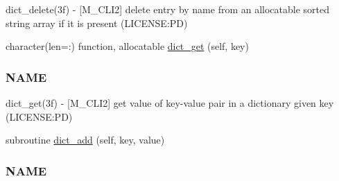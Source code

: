 \begin{DoxyCompactItemize}
\begin{DoxyCompactList}
dict\+\_\+delete(3f) -\/ \mbox{[}M\+\_\+\+C\+L\+I2\mbox{]} delete entry by name from an allocatable sorted string array if it is present (L\+I\+C\+E\+N\+SE\+:PD) \end{DoxyCompactList}\item 
character(len=\+:) function, allocatable \mbox{\hyperlink{namespacem__cli2_a5b489c992f1434fa27e7858a483a38c7}{dict\+\_\+get}} (self, key)
\begin{DoxyCompactList}\small\item\em \subsubsection*{N\+A\+ME}

dict\+\_\+get(3f) -\/ \mbox{[}M\+\_\+\+C\+L\+I2\mbox{]} get value of key-\/value pair in a dictionary given key (L\+I\+C\+E\+N\+SE\+:PD) \end{DoxyCompactList}\item 
subroutine \mbox{\hyperlink{namespacem__cli2_a601a06b7038b524abababc8d437ee823}{dict\+\_\+add}} (self, key, value)
\begin{DoxyCompactList}\small\item\em \subsubsection*{N\+A\+ME}


\end{DoxyCompactList}
\end{DoxyCompactItemize}

